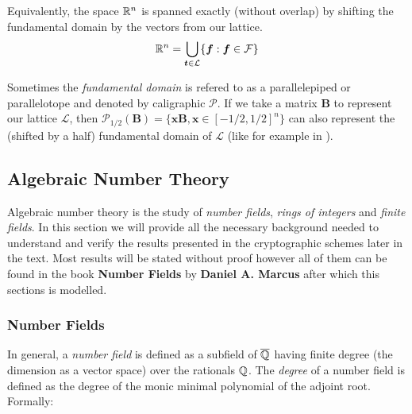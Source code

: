 Equivalently, the space $\mathbb{R}^n$ is spanned exactly (without overlap) by shifting the fundamental domain by the vectors from our lattice.
$$ \mathbb{R}^n = \bigcup_{\boldsymbol{t} \in \mathcal{L}} \{\boldsymbol{f} : \boldsymbol{f} \in \mathcal{F} \}$$

\begin{remark}
    Sometimes the \textit{fundamental domain} is refered to as a parallelepiped or parallelotope and denoted by caligraphic $\mathcal{P}$. If we take a matrix $\bm{B}$ to represent our lattice $\mathcal{L}$, then $\mathcal{P}_{1/2}(\bm{B}) = \{\bm{x}\bm{B}, \bm{x} \in [-1/2, 1/2]^n \}$ can also represent the (shifted by a half) fundamental domain of $\mathcal{L}$ (like for example in \cite{gentry}).
\end{remark}

\iffalse
We will now present two results that give us an upper bound on the length of the shortest vector in a lattice. This will later on be useful to determine the security of our schemes. These theorems are due to Hermite (1822 - 1901) and Minkowski (1864 - 1909).

\begin{theorem}[Hermite's Theorem]
    Every lattice $\mathcal{L}$ of dimension $n$ contains a nonzero vector $v \in \mathcal{L}$ satisfying
    $$ \norm{v} \leq \sqrt{n} \det(\mathcal{L})^{\frac{1}{n}}.$$
\end{theorem}

\begin{remark}
    
\end{remark}
\fi

\subsection{Algebraic Number Theory}

Algebraic number theory is the study of \textit{number fields}, \textit{rings of integers} and \textit{finite fields}. In this section we will provide all the necessary background needed to understand and verify the results presented in the cryptographic schemes later in the text. Most results will be stated without proof however all of them can be found in the book \textbf{Number Fields} by \textbf{Daniel A. Marcus} \cite{algebra} after which this sections is modelled.

\subsubsection*{Number Fields}
In general, a \textit{number field} is defined as a subfield of $\overline{\mathbb{Q}}$ having finite degree (the dimension as a vector space) over the rationals $\mathbb{Q}$. The \textit{degree} of a number field is defined as the degree of the monic minimal polynomial of the adjoint root. Formally:


